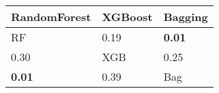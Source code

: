 \begin{tabular}{lll}
\toprule
RandomForest & XGBoost & Bagging \\
\midrule
RF & 0.19 & \textbf{0.01} \\
0.30 & XGB & 0.25 \\
\textbf{0.01} & 0.39 & Bag \\
\bottomrule
\end{tabular}

